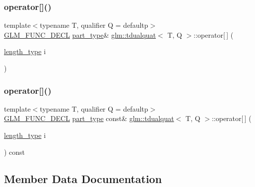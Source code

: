 \subsubsection{\texorpdfstring{operator[]()}{operator[]()}\hspace{0.1cm}{\footnotesize\ttfamily [1/2]}}
{\footnotesize\ttfamily template$<$typename T, qualifier Q = defaultp$>$ \\
\hyperlink{setup_8hpp_ab2d052de21a70539923e9bcbf6e83a51}{G\+L\+M\+\_\+\+F\+U\+N\+C\+\_\+\+D\+E\+CL} \hyperlink{structglm_1_1tdualquat_ab18b8665bbd568f9bc93ef93ed475a47}{part\+\_\+type}\& \hyperlink{structglm_1_1tdualquat}{glm\+::tdualquat}$<$ T, Q $>$\+::operator\mbox{[}$\,$\mbox{]} (\begin{DoxyParamCaption}\item[{\hyperlink{structglm_1_1tdualquat_ad9fa4fd7f84d17bebd3efed6b5455d80}{length\+\_\+type}}]{i }\end{DoxyParamCaption})}

\mbox{\label{structglm_1_1tdualquat_a8a6db73181f9b7cba58d95704734f8e4}} 
\subsubsection{\texorpdfstring{operator[]()}{operator[]()}\hspace{0.1cm}{\footnotesize\ttfamily [2/2]}}
{\footnotesize\ttfamily template$<$typename T, qualifier Q = defaultp$>$ \\
\hyperlink{setup_8hpp_ab2d052de21a70539923e9bcbf6e83a51}{G\+L\+M\+\_\+\+F\+U\+N\+C\+\_\+\+D\+E\+CL} \hyperlink{structglm_1_1tdualquat_ab18b8665bbd568f9bc93ef93ed475a47}{part\+\_\+type} const\& \hyperlink{structglm_1_1tdualquat}{glm\+::tdualquat}$<$ T, Q $>$\+::operator\mbox{[}$\,$\mbox{]} (\begin{DoxyParamCaption}\item[{\hyperlink{structglm_1_1tdualquat_ad9fa4fd7f84d17bebd3efed6b5455d80}{length\+\_\+type}}]{i }\end{DoxyParamCaption}) const}



\subsection{Member Data Documentation}
\mbox{\label{structglm_1_1tdualquat_a6e9bac4577ea5ff7e47104c183f3955a}} 
